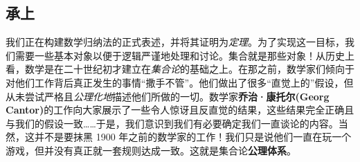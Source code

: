 \subsection{承上}

我们正在构建数学归纳法的正式表述，并将其证明为\emph{定理}。为了实现这一目标，我们需要一些基本对象以便于逻辑严谨地处理和讨论。集合就是那些对象！从历史上看，数学是在二十世纪初才建立在\emph{集合论}的基础之上。在那之前，数学家们倾向于对他们工作背后真正发生的事情``撒手不管''。他们做出了很多``直觉上的''假设，但从未尝试严格且\emph{公理化地}描述他们所做的一切。数学家\textbf{乔治·康托尔(Georg Cantor)}的工作向大家展示了一些令人惊讶且反直觉的结果，这些结果完全正确且与我们的假设一致……于是，我们意识到我们有必要确定我们一直谈论的内容。当然，这并不是要抹黑 1900 年之前的数学家的工作！我们只是说他们一直在玩一个游戏，但并没有真正就一套规则达成一致。这就是集合论\textbf{公理体系}。
